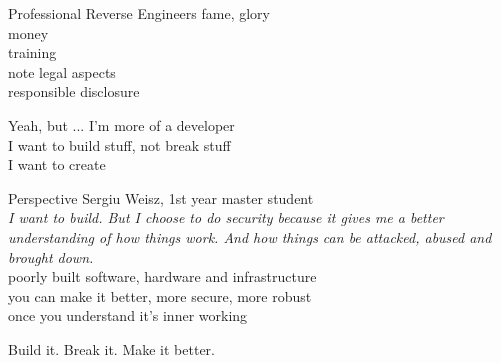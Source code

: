 \documentclass{simple}
\begin{document}
\begin{frame}{Professional Reverse Engineers}
  \centering
  \pause fame, glory \\
  \vspace{0.5cm}
  \pause money \\
  \vspace{0.5cm}
  \pause training \\
  \vspace{0.5cm}
  \pause note legal aspects \\
  \vspace{0.5cm}
  \pause responsible disclosure
\end{frame}

\begin{frame}{Yeah, but ...}
  \centering
  \pause I'm more of a developer \\
  \vspace{0.5cm}
  \pause I want to build stuff, not break stuff \\
  \vspace{0.5cm}
  \pause I want to create
\end{frame}

\begin{frame}{Perspective}
  \pause Sergiu Weisz, 1st year master student \\
  \vspace{0.5cm}
  \pause \textit{I want to build. But I choose to do security because it gives me a better understanding of how things work. And how things can be attacked, abused and brought down.} \\
  \vspace{0.5cm}
  \pause poorly built software, hardware and infrastructure \\
  \vspace{0.5cm}
  \pause you can make it better, more secure, more robust \\
  \vspace{0.5cm}
  \pause once you understand it's inner working
\end{frame}

\begin{frame}{}
  \centering
  \LARGE{Build it. \pause Break it. \pause Make it better.}
\end{frame}
\end{document}
